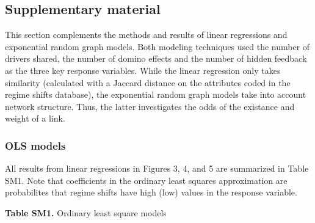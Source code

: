 \documentclass[9pt,]{article}
\begin{document}
\pagebreak

\subsection{Supplementary material}\label{supplementary-material}

This section complements the methods and results of linear regressions
and exponential random graph models. Both modeling techniques used the
number of drivers shared, the number of domino effects and the number of
hidden feedback as the three key response variables. While the linear
regression only takes similarity (calculated with a Jaccard distance on
the attributes coded in the regime shifts database), the exponential
random graph models take into account network structure. Thus, the
latter investigates the odds of the existance and weight of a link.

\subsubsection{OLS models}\label{ols-models}

All results from linear regressions in Figures 3, 4, and 5 are
summarized in Table SM1. Note that coefficients in the ordinary least
squares approximation are probabilites that regime shifts have high
(low) values in the response variable.

\textbf{Table SM1.} Ordinary least square models

\begingroup  \footnotesize 
\end{document}
